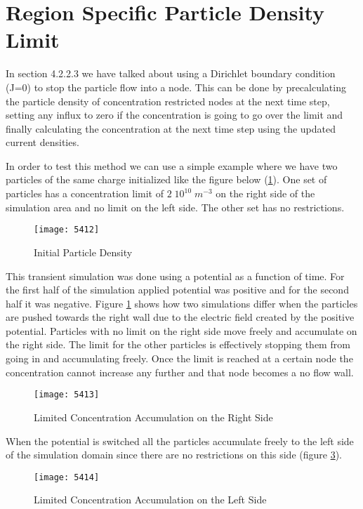 \clearpage
\section{Region Specific Particle Density Limit}

In section 4.2.2.3 we have talked about using a Dirichlet boundary condition (J=0) to stop the particle flow into a node. This can be done by precalculating the particle density of concentration restricted nodes at the next time step, setting any influx to zero if the concentration is going to go over the limit and finally calculating the concentration at the next time step using the updated current densities. 

In order to test this method we can use a simple example where we have two particles of the same charge initialized like the figure below (\ref{5412}). One set of particles has a concentration limit of $2 \; 10^{10} \; m^{-3}$ on the right side of the simulation area and no limit on the left side. The other set has no restrictions.
\begin{figure}[!htp]
\centering
\texttt{[image: 5412]}
\caption{Initial Particle Density} 
\label{5412}
\end{figure}

This transient simulation was done using a potential as a function of time. For the first half of the simulation applied potential was positive and for the second half it was negative. Figure \ref{5412} shows how two simulations differ when the particles are pushed towards the right wall due to the electric field created by the positive potential. Particles with no limit on the right side move freely and accumulate on the right side. The limit for the other particles is effectively stopping them from going in and accumulating freely. Once the limit is reached at a certain node the concentration cannot increase any further and that node becomes a no flow wall. 

\begin{figure}[!htp]
\centering
\texttt{[image: 5413]}
\caption{Limited Concentration Accumulation on the Right Side} 
\label{5413}
\end{figure}

When the potential is switched all the particles accumulate freely to the left side of the simulation domain since there are no restrictions on this side (figure \ref{5414}).
\begin{figure}[!htp]
\centering
\texttt{[image: 5414]}
\caption{Limited Concentration Accumulation on the Left Side} 
\label{5414}
\end{figure}

